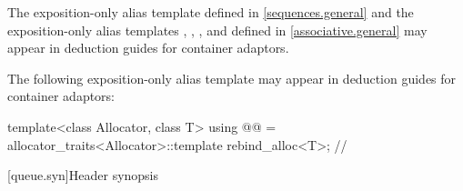 \pnum
The exposition-only alias template 
defined in \ref{sequences.general} and
the exposition-only alias templates , ,
, and 
defined in \ref{associative.general}
may appear in deduction guides for container adaptors.

\pnum
The following exposition-only alias template
may appear in deduction guides for container adaptors:
\begin{codeblock}
template<class Allocator, class T>
  using @@ = allocator_traits<Allocator>::template rebind_alloc<T>;   // \expos
\end{codeblock}

[queue.syn]{Header  synopsis}

